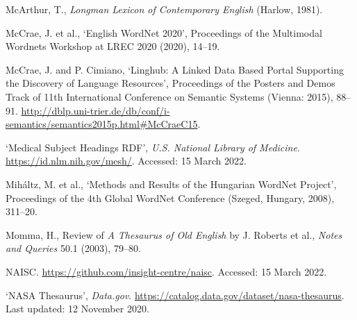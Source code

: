 \begin{list}{}
\item %
McArthur, T., \textit{Longman Lexicon of Contemporary English} (Harlow, 1981).

\item %
McCrae, J. et al., `English WordNet 2020', Proceedings of the Multimodal Wordnets Workshop at LREC 2020 (2020), 14–19.

\item %
McCrae, J. and P. Cimiano, `Linghub: A Linked Data Based Portal Supporting the Discovery of Language Resources', Proceedings of the Posters and Demos Track of 11th International Conference on Semantic Systems (Vienna: 2015), 88–91. \url{http://dblp.uni-trier.de/db/conf/i-semantics/semantics2015p.html#McCraeC15}.

\item %
`Medical Subject Headings RDF', \textit{U.S. National Library of Medicine}. \url{https://id.nlm.nih.gov/mesh/}. Accessed: 15 March 2022. 

\item %
Miháltz, M. et al., `Methods and Results of the Hungarian WordNet Project', Proceedings of the 4th Global WordNet Conference (Szeged, Hungary, 2008), 311–20.

\item %
Momma, H., Review of \textit{A Thesaurus of Old English} by J. Roberts et al., \textit{Notes and Queries} 50.1 (2003), 79–80.

\item %
NAISC. \url{https://github.com/insight-centre/naisc}. Accessed: 15 March 2022.

\item
`NASA Thesaurus', \textit{Data.gov}. \url{https://catalog.data.gov/dataset/nasa-thesaurus}. Last updated: 12 November 2020.






\end{list}

